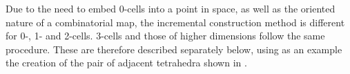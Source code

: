 Due to the need to embed 0-cells into a point in space, as well as the oriented nature of a combinatorial map, the incremental construction method is different for 0-, 1- and 2-cells.
3-cells and those of higher dimensions follow the same procedure.
These are therefore described separately below, using as an example the creation of the pair of adjacent tetrahedra shown in .

